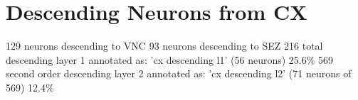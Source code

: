     


        
        

\section{Descending Neurons from CX}
            129 neurons descending to VNC
            93 neurons descending to SEZ
            216 total descending
            layer 1 annotated as: 'cx descending l1' (56 neurons) 25.6\%
            569 second order descending
            layer 2 annotated as: 'cx descending l2' (71 neurons of 569) 12.4\%



